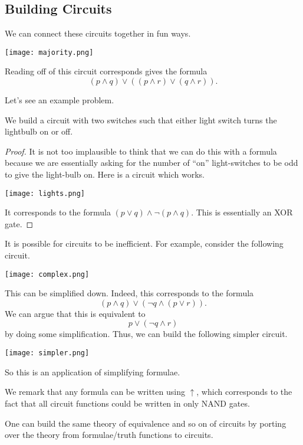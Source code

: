 \documentclass[../notes.tex]{subfiles}
\begin{document}
\subsection{Building Circuits}
We can connect these circuits together in fun ways.
\begin{center}
	\texttt{[image: majority.png]}
\end{center}
Reading off of this circuit corresponds gives the formula
\[(p\land q)\lor((p\land r)\lor(q\land r)).\]

Let's see an example problem.
\begin{exe}
	We build a circuit with two switches such that either light switch turns the lightbulb on or off.
\end{exe}
\begin{proof}
	It is not too implausible to think that we can do this with a formula because we are essentially asking for the number of ``on'' light-switches to be odd to give the light-bulb on. Here is a circuit which works.
	\begin{center}
		\texttt{[image: lights.png]}
	\end{center}
	It corresponds to the formula $(p\lor q)\land\lnot(p\land q)$. This is essentially an XOR gate.
\end{proof}
It is possible for circuits to be inefficient. For example, consider the following circuit.
\begin{center}
	\texttt{[image: complex.png]}
\end{center}
This can be simplified down. Indeed, this corresponds to the formula
\[(p\land q)\lor(\lnot q\land(p\lor r)).\]
We can argue that this is equivalent to
\[p\lor(\lnot q\land r)\]
by doing some simplification. Thus, we can build the following simpler circuit.
\begin{center}
	\texttt{[image: simpler.png]}
\end{center}
So this is an application of simplifying formulae.
\begin{remark}
	We remark that any formula can be written using $\uparrow$, which corresponds to the fact that all circuit functions could be written in only NAND gates.
\end{remark}
\begin{remark}
	One can build the same theory of equivalence and so on of circuits by porting over the theory from formulae/truth functions to circuits.
\end{remark}
\end{document}
